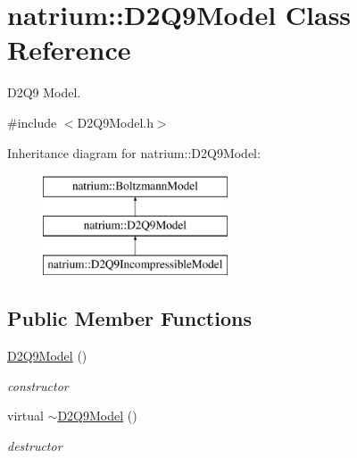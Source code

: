 \hypertarget{classnatrium_1_1D2Q9Model}{\section{natrium\-:\-:\-D2\-Q9\-Model \-Class \-Reference}
\label{classnatrium_1_1D2Q9Model}
}


\-D2\-Q9 \-Model.  




{\ttfamily \#include $<$\-D2\-Q9\-Model.\-h$>$}

\-Inheritance diagram for natrium\-:\-:\-D2\-Q9\-Model\-:\begin{figure}[H]
\begin{center}
\leavevmode
\includegraphics[height=3.000000cm]{classnatrium_1_1D2Q9Model}
\end{center}
\end{figure}
\subsection*{\-Public \-Member \-Functions}
\begin{DoxyCompactItemize}
\item 
\hypertarget{classnatrium_1_1D2Q9Model_a7e74339f0f5ea880f8e6162a2db23055}{\hyperlink{classnatrium_1_1D2Q9Model_a7e74339f0f5ea880f8e6162a2db23055}{\-D2\-Q9\-Model} ()}\label{classnatrium_1_1D2Q9Model_a7e74339f0f5ea880f8e6162a2db23055}

\begin{DoxyCompactList}\small\item\em constructor \end{DoxyCompactList}\item 
\hypertarget{classnatrium_1_1D2Q9Model_aec7d8c160f430e14fbede9ecda368797}{virtual \hyperlink{classnatrium_1_1D2Q9Model_aec7d8c160f430e14fbede9ecda368797}{$\sim$\-D2\-Q9\-Model} ()}\label{classnatrium_1_1D2Q9Model_aec7d8c160f430e14fbede9ecda368797}

\begin{DoxyCompactList}\small\item\em destructor \end{DoxyCompactList}\end{DoxyCompactItemize}
